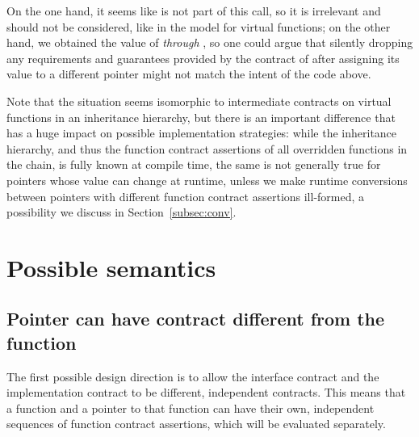On the one hand, it seems like  is not part of this call, so it is irrelevant and should not be considered, like in the \cite{P3097R0} model for virtual functions; on the other hand, we obtained the value of  \emph{through} , so one could argue that silently dropping any requirements and guarantees provided by the contract of  after assigning its value to a different pointer might not match the intent of the code above.

Note that the situation seems isomorphic to intermediate contracts on virtual functions in an inheritance hierarchy, but there is an important difference that has a huge impact on possible implementation strategies: while the inheritance hierarchy, and thus the function contract assertions of all overridden functions in the chain, is fully known at compile time, the same is not generally true for pointers whose value can change at runtime, unless we make runtime conversions between pointers with different function contract assertions ill-formed, a possibility we discuss in Section~\ref{subsec:conv}.

\section{Possible semantics}
\label{sec:semantics}

\subsection{Pointer can have contract different from the function}
\label{subsec:diffcontract}

The first possible design direction is to allow the interface contract and the implementation contract to be different, independent contracts. This means that a function and a pointer to that function can have their own, independent sequences of function contract assertions, which will be evaluated separately. 

